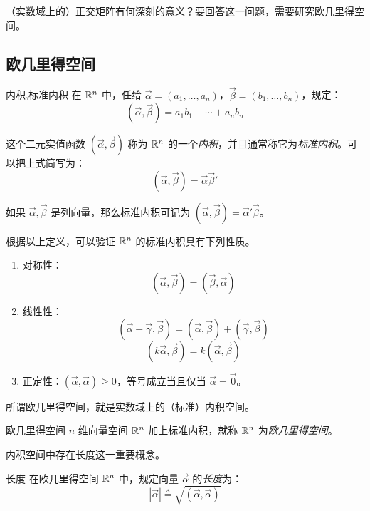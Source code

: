 （实数域上的）正交矩阵有何深刻的意义？要回答这一问题，需要研究欧几里得空间。

\subsection{欧几里得空间}

\begin{definition}{内积,标准内积}
	在 $\mathbb R^n$ 中，任给 $\vec \alpha = (a_1, \ldots, a_n)$，$\vec \beta = (b_1, \ldots, b_n)$，规定：
	$$
	(\vec \alpha, \vec \beta) = a_1 b_1 + \cdots + a_n b_n
	$$

	这个二元实值函数 $(\vec \alpha, \vec \beta)$ 称为 $\mathbb R^n$ 的一个\emph{内积}，并且通常称它为\emph{标准内积}。可以把上式简写为：
	$$
	(\vec \alpha, \vec \beta) = \vec \alpha \vec \beta'
	$$

	如果 $\vec \alpha, \vec \beta$ 是列向量，那么标准内积可记为 $(\vec \alpha, \vec \beta) = \vec \alpha' \vec \beta$。
\end{definition}

根据以上定义，可以验证 $\mathbb R^n$ 的标准内积具有下列性质。

\begin{theorem}[标准内积的性质]
	\begin{enumerate}
		\item 对称性：
		$$
		(\vec \alpha, \vec \beta) = (\vec \beta, \vec \alpha)
		$$
		\item 线性性：
		$$
		(\vec \alpha + \vec \gamma, \vec \beta) = (\vec \alpha, \vec \beta) + (\vec \gamma, \vec \beta)
		$$$$
		(k \vec \alpha, \vec \beta) = k(\vec \alpha, \vec \beta)
		$$
		\item 正定性：$(\vec \alpha, \vec \alpha) \ge 0$，等号成立当且仅当 $\vec \alpha = \vec 0$。
	\end{enumerate}
\end{theorem}

所谓欧几里得空间，就是实数域上的（标准）内积空间。

\begin{definition}{欧几里得空间}
	$n$ 维向量空间 $\mathbb R^n$ 加上标准内积，就称 $\mathbb R^n$ 为\emph{欧几里得空间}。
\end{definition}

内积空间中存在长度这一重要概念。

\begin{definition}{长度}
	在欧几里得空间 $\mathbb R^n$ 中，规定向量 $\vec \alpha$ 的\emph{长度}为：
	$$
	|\vec \alpha| \triangleq \sqrt{(\vec \alpha, \vec \alpha)}
	$$
\end{definition}

